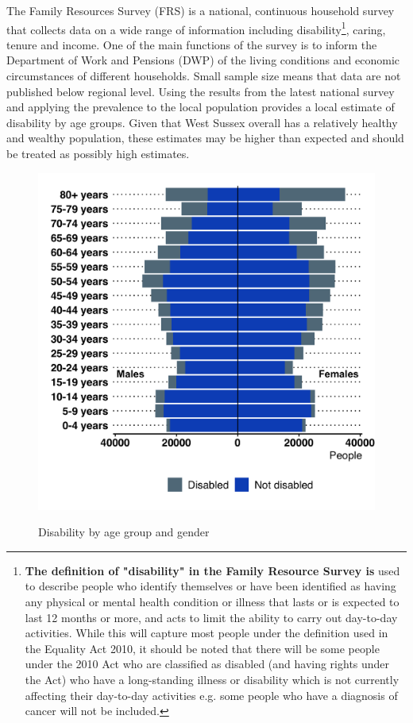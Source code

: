 The Family Resources Survey (FRS) is a national, continuous household survey that collects data on a wide range of information including disability\footnote{{\bf The definition of "disability" in the Family Resource Survey is} used to describe people who identify themselves or have been identified as having any physical or mental health condition or illness that lasts or is expected to last 12 months or more, and acts to limit the ability to carry out day-to-day activities. While this will capture most people under the definition used in the Equality Act 2010, it should be noted that there will be some people under the 2010 Act who are classified as disabled (and having rights under the Act) who have a long-standing illness or disability which is not currently affecting their day-to-day activities e.g. some people who have a diagnosis of cancer will not be included.}, caring, tenure and income. One of the main functions of the survey is to inform the Department of Work and Pensions (DWP) of the living conditions and economic circumstances of different households. Small sample size means that data are not published below regional level. Using the results from the latest national survey and applying the prevalence to the local population provides a local estimate of disability by age groups. Given that West Sussex overall has a relatively healthy and wealthy population, these estimates may be higher than expected and should be treated as possibly high estimates.

\begin{figure}[htp]
    \caption{Disability by age group and gender}
    \centering
	\includegraphics[width=\linewidth]{images/frs_disability_wsx.png}
	\label{fig:frs_diab_wsx}
\end{figure}

